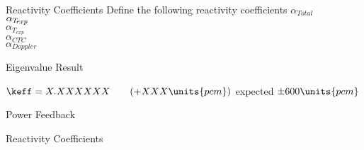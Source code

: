 \begin{frame}{Reactivity Coefficients}
  Define the following reactivity coefficients 
  $\alpha_{Total}$\\
  $\alpha_{T_{\!\mbox{\scriptsize \em exp}}}$\\
  $\alpha_{T_{exp}}$\\
  $\alpha_{CTC}$\\ %
  $\alpha_{Doppler}$
\end{frame}

\begin{frame}{Eigenvalue Result}
  \vspace{-0.25in}
  \begin{figure}
    \centering
    \hspace{1in}
  \end{figure}
  \begin{block}{}
    $\keff = X.XXXXXX \qquad (+XXX \units{pcm})$ expected $\pm 600\units{pcm}$
  \end{block}
\end{frame}

\begin{frame}{Power Feedback}
  \begin{figure}
    \centering
  \end{figure}
\end{frame}

\begin{frame}{Reactivity Coefficients}
\end{frame}
